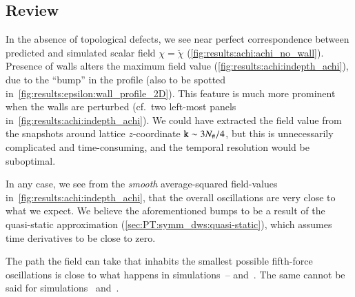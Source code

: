


    


    

\subsection{Review} %
    In the absence of topological defects, we see near perfect correspondence between predicted and simulated scalar field $\chi=\breve{\chi}$ (\cref{fig:results:achi:achi_no_wall}). Presence of walls alters the maximum field value (\cref{fig:results:achi:indepth_achi}), due to the ``bump'' in the profile (also to be spotted in~\cref{fig:results:epsilon:wall_profile_2D}). This feature is much more prominent when the walls are perturbed (cf.~two left-most panels in~\cref{fig:results:achi:indepth_achi}). %
    We could have extracted the field value from the snapshots around lattice $z$-coordinate $\mathtt{k}\sim 3 N_\#/4$, but this is unnecessarily complicated and time-consuming, and the temporal resolution would be suboptimal. 

    In any case, we see from the \emph{smooth} average-squared field-values in~\cref{fig:results:achi:indepth_achi}, that the overall oscillations are very close to what we expect. %
    We believe the aforementioned bumps to be a result of the quasi-static approximation (\cref{sec:PT:symm_dws:quasi-static}), which assumes time derivatives to be close to zero.

    The path the field can take that inhabits the smallest possible fifth-force oscillations is close to what happens in simulations~-- and~. The same cannot be said for simulations~ and~.
    